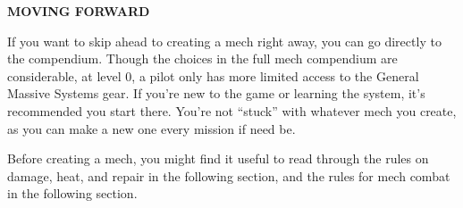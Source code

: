 \begin{center}
 \textbf{MOVING FORWARD}     
\end{center}

If you want to skip ahead to creating a mech right away, you can go directly to the compendium. Though the choices in the full mech compendium are considerable, at level 0, a pilot only has more limited access to the General Massive Systems gear. If you're new to the game or learning the system, it's recommended you start there. You’re not ``stuck'' with whatever mech you create, as you can make a new one every mission if need be.

Before creating a mech, you might find it useful to read through the rules on damage, heat, and repair in the following section, and the rules for mech combat in the following section.

